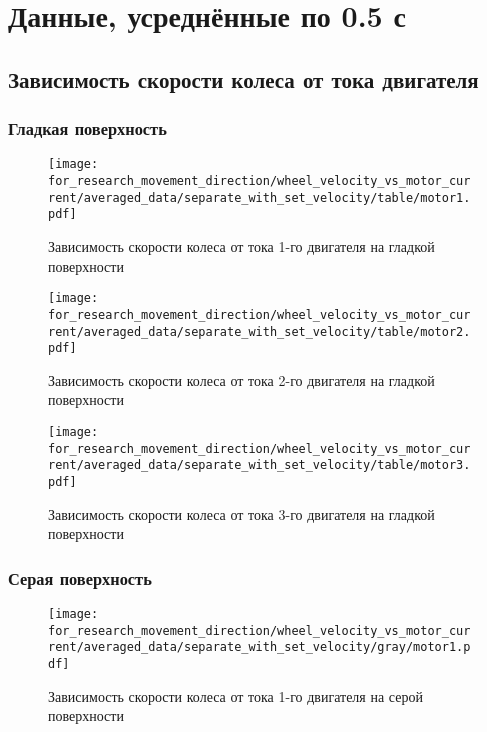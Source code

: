 \section{Данные, усреднённые по 0.5 с}

\subsection{Зависимость скорости колеса от тока двигателя}

\subsubsection{Гладкая поверхность}

\begin{figure}[H]
    \centering
    \texttt{[image: for\_research\_movement\_direction/wheel\_velocity\_vs\_motor\_current/averaged\_data/separate\_with\_set\_velocity/table/motor1.pdf]}
    \caption{Зависимость скорости колеса от тока 1-го двигателя на гладкой поверхности}
\end{figure}

\begin{figure}[H]
    \centering
    \texttt{[image: for\_research\_movement\_direction/wheel\_velocity\_vs\_motor\_current/averaged\_data/separate\_with\_set\_velocity/table/motor2.pdf]}
    \caption{Зависимость скорости колеса от тока 2-го двигателя на гладкой поверхности}
\end{figure}

\begin{figure}[H]
    \centering
    \texttt{[image: for\_research\_movement\_direction/wheel\_velocity\_vs\_motor\_current/averaged\_data/separate\_with\_set\_velocity/table/motor3.pdf]}
    \caption{Зависимость скорости колеса от тока 3-го двигателя на гладкой поверхности}
\end{figure}

\subsubsection{Серая поверхность}

\begin{figure}[H]
    \centering
    \texttt{[image: for\_research\_movement\_direction/wheel\_velocity\_vs\_motor\_current/averaged\_data/separate\_with\_set\_velocity/gray/motor1.pdf]}
    \caption{Зависимость скорости колеса от тока 1-го двигателя на серой поверхности}
\end{figure}

